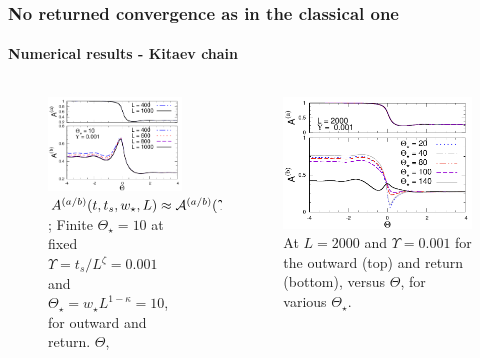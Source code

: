 \begin{frame}
	\frametitle{No returned convergence as in the classical one}
	\framesubtitle{Numerical results - Kitaev chain}
	
	\begin{columns}
	\begin{column}{0.52\textwidth}
		\begin{figure}[!htb]
			\includegraphics[width=1\columnwidth]{paper/headKITY0001Th10A.pdf}
  			\caption{ \alert{$ A^{(a/b)}(t,t_s,w_\star,L) \approx 
 				{\cal A}^{(a/b)}(\Upsilon,\Theta,\Theta_\star)\,\,$};
  			Finite $\Theta_\star=10$ at fixed $\Upsilon =t_s/L^\zeta = 0.001$
  			and $\Theta_\star = w_\star L^{1-\kappa}=10$, for outward
  			 and return.
    $\Theta$, }
  			\label{roundtripdfssE}
		\end{figure}
	
	\end{column}
	\begin{column}{0.5\textwidth}
	
	\begin{figure}[!htb]
  		\includegraphics[width=1\columnwidth]{paper/headKITY0001L2000A.pdf}
 		\caption{At $L=2000$ and $\Upsilon = 0.001$ for the outward (top)
 		 and return (bottom), versus $\Theta$, for various 
 		 $\Theta_\star$. $\qquad \qquad \qquad \qquad \qquad \qquad \qquad \qquad \qquad \qquad \qquad \qquad \qquad \qquad \qquad \qquad$}
  \label{diffThetaStarA}
\end{figure}


\end{column}
\end{columns}
\end{frame}
